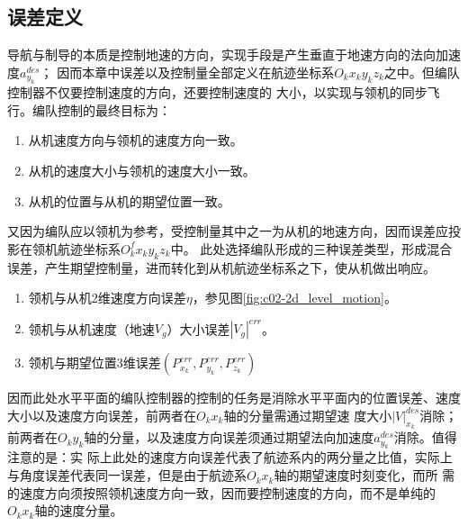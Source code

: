 \subsection{误差定义}
导航与制导的本质是控制地速的方向，实现手段是产生垂直于地速方向的法向加速度$a_{y_k}^{des}$；
因而本章中误差以及控制量全部定义在航迹坐标系$O_kx_ky_kz_k$之中。但编队控制器不仅要控制速度的方向，还要控制速度的
大小，以实现与领机的同步飞行。编队控制的最终目标为：
\begin{enumerate}
    \item 从机速度方向与领机的速度方向一致。
    \item 从机的速度大小与领机的速度大小一致。
    \item 从机的位置与从机的期望位置一致。
\end{enumerate}
又因为编队应以领机为参考，受控制量其中之一为从机的地速方向，因而误差应投影在领机航迹坐标系$O^{f}_kx_ky_kz_k$中。
此处选择编队形成的三种误差类型，形成混合误差，产生期望控制量，进而转化到从机航迹坐标系之下，使从机做出响应。
\begin{enumerate}
    \item 领机与从机2维速度方向误差$\eta$，参见图\ref{fig:c02-2d_level_motion}。
    \item 领机与从机速度（地速$V_g$）大小误差$|V_g|^{err}$。
    \item 领机与期望位置3维误差$(P_{x_k}^{err},P_{y_k}^{err},P_{z_k}^{err})$
\end{enumerate}
因而此处水平平面的编队控制器的控制的任务是消除水平平面内的位置误差、速度大小以及速度方向误差，前两者在$O_kx_k$轴的分量需通过期望速
度大小${|V|}_{x_k}^{des}$消除；前两者在$O_ky_k$轴的分量，以及速度方向误差须通过期望法向加速度$a_{y_k}^{des}$消除。值得注意的是：实
际上此处的速度方向误差代表了航迹系内的两分量之比值，实际上与角度误差代表同一误差，但是由于航迹系$O_kx_k$轴的期望速度时刻变化，而所
需的速度方向须按照领机速度方向一致，因而要控制速度的方向，而不是单纯的$O_kx_k$轴的速度分量。
